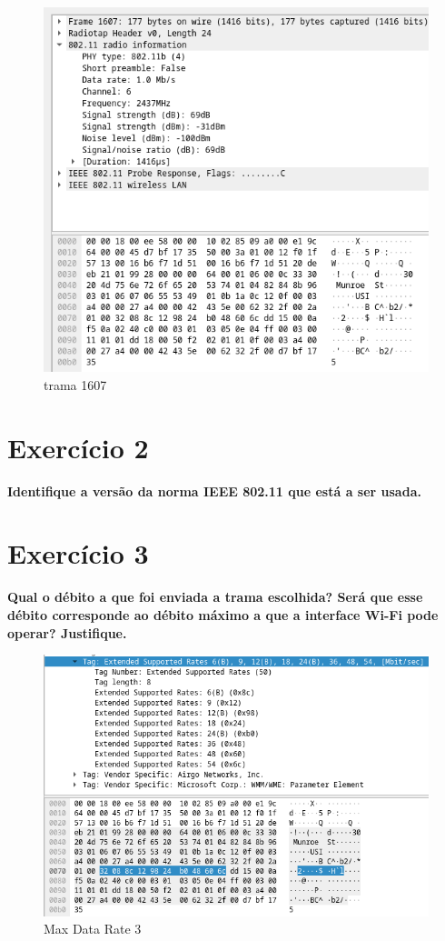 \documentclass[a4paper]{report}
\begin{document}
\begin{figure}[H]
    \centering 
    \includegraphics[width=\textwidth]{images/trama1607.png}  
    \caption{trama 1607}
    \label{fig:trama1607}
\end{figure}

\section{Exercício 2}
\textbf{Identifique a versão da norma IEEE 802.11 que está a ser usada.}

\section{Exercício 3}
\textbf{Qual o débito a que foi enviada a trama escolhida? Será que esse débito
    corresponde ao débito máximo a que a interface Wi-Fi pode operar?
    Justifique.}

\begin{figure}[H]
    \centering 
    \includegraphics[width=\textwidth]{images/maxDataRate3.png}  
    \caption{Max Data Rate 3}
    \label{fig:maxDataRate3}
\end{figure}
\end{document}

